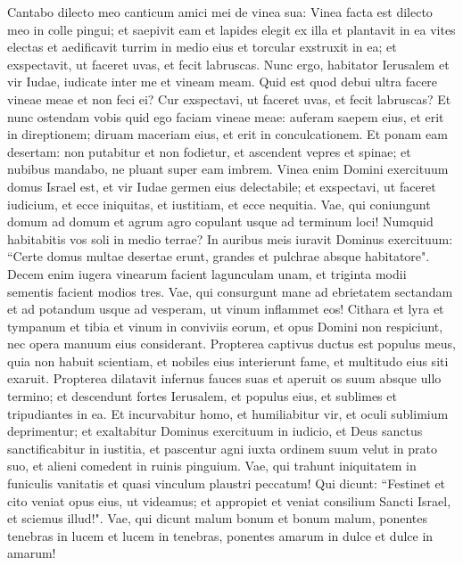\begin{biblechapter}  
\verse Cantabo dilecto meo canticum amici mei de vinea sua: Vinea facta est dilecto meo in colle pingui; 
\verse et saepivit eam et lapides elegit ex illa et plantavit in ea vites electas et aedificavit turrim in medio eius et torcular exstruxit in ea; et exspectavit, ut faceret uvas, et fecit labruscas. 
\verse Nunc ergo, habitator Ierusalem et vir Iudae, iudicate inter me et vineam meam. 
\verse Quid est quod debui ultra facere vineae meae et non feci ei? Cur exspectavi, ut faceret uvas, et fecit labruscas? 
\verse Et nunc ostendam vobis quid ego faciam vineae meae: auferam saepem eius, et erit in direptionem; diruam maceriam eius, et erit in conculcationem. 
\verse Et ponam eam desertam: non putabitur et non fodietur, et ascendent vepres et spinae; et nubibus mandabo, ne pluant super eam imbrem. 
\verse Vinea enim Domini exercituum domus Israel est, et vir Iudae germen eius delectabile; et exspectavi, ut faceret iudicium, et ecce iniquitas, et iustitiam, et ecce nequitia. 
\verse Vae, qui coniungunt domum ad domum et agrum agro copulant usque ad terminum loci! Numquid habitabitis vos soli in medio terrae? 
\verse In auribus meis iuravit Dominus exercituum: “Certe domus multae desertae erunt, grandes et pulchrae absque habitatore". 
\verse Decem enim iugera vinearum facient lagunculam unam, et triginta modii sementis facient modios tres. 
\verse Vae, qui consurgunt mane ad ebrietatem sectandam et ad potandum usque ad vesperam, ut vinum inflammet eos! 
\verse Cithara et lyra et tympanum et tibia et vinum in conviviis eorum, et opus Domini non respiciunt, nec opera manuum eius considerant. 
\verse Propterea captivus ductus est populus meus, quia non habuit scientiam, et nobiles eius interierunt fame, et multitudo eius siti exaruit. 
\verse Propterea dilatavit infernus fauces suas et aperuit os suum absque ullo termino; et descendunt fortes Ierusalem, et populus eius, et sublimes et tripudiantes in ea. 
\verse Et incurvabitur homo, et humiliabitur vir, et oculi sublimium deprimentur; 
\verse et exaltabitur Dominus exercituum in iudicio, et Deus sanctus sanctificabitur in iustitia, 
\verse et pascentur agni iuxta ordinem suum velut in prato suo, et alieni comedent in ruinis pinguium. 
\verse Vae, qui trahunt iniquitatem in funiculis vanitatis et quasi vinculum plaustri peccatum! 
\verse Qui dicunt: “Festinet et cito veniat opus eius, ut videamus; et appropiet et veniat consilium Sancti Israel, et sciemus illud!". 
\verse Vae, qui dicunt malum bonum et bonum malum, ponentes tenebras in lucem et lucem in tenebras, ponentes amarum in dulce et dulce in amarum! 

\end{biblechapter}

